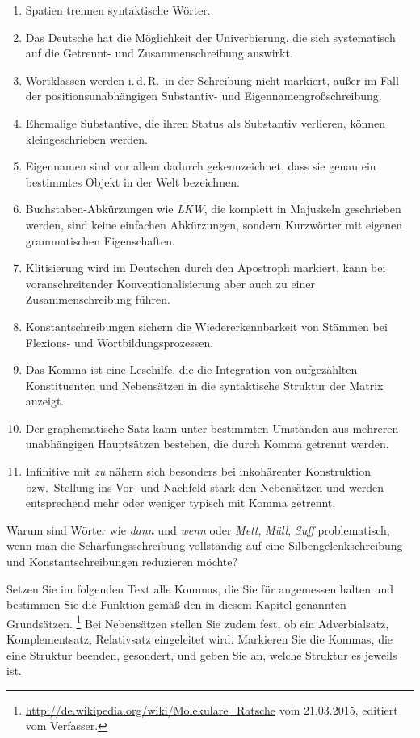 \begin{enumerate}\Lf
  \item Spatien trennen syntaktische Wörter.
  \item Das Deutsche hat die Möglichkeit der Univerbierung, die sich systematisch auf die Getrennt- und Zusammenschreibung auswirkt.
  \item Wortklassen werden i.\,d.\,R.\ in der Schreibung nicht markiert, außer im Fall der positionsunabhängigen Substantiv- und Eigennamengroßschreibung.
  \item Ehemalige Substantive, die ihren Status als Substantiv verlieren, können kleingeschrieben werden.
  \item Eigennamen sind vor allem dadurch gekennzeichnet, dass sie genau ein bestimmtes Objekt in der Welt bezeichnen.
  \item Buchstaben-Abkürzungen wie \textit{LKW}, die komplett in Majuskeln geschrieben werden, sind keine einfachen Abkürzungen, sondern Kurzwörter mit eigenen grammatischen Eigenschaften. 
  \item Klitisierung wird im Deutschen durch den Apostroph markiert, kann bei voranschreitender Konventionalisierung aber auch zu einer Zusammenschreibung führen.
  \item Konstantschreibungen sichern die Wiedererkennbarkeit von Stämmen bei Flexions- und Wortbildungsprozessen.
  \item Das Komma ist eine Lesehilfe, die die Integration von aufgezählten Konstituenten und Nebensätzen in die syntaktische Struktur der Matrix anzeigt.
  \item Der graphematische Satz kann unter bestimmten Umständen aus mehreren unabhängigen Hauptsätzen bestehen, die durch Komma getrennt werden.
  \item Infinitive mit \textit{zu} nähern sich besonders bei inkohärenter Konstruktion bzw.\ Stellung ins Vor- und Nachfeld stark den Nebensätzen und werden entsprechend mehr oder weniger typisch mit Komma getrennt.
\end{enumerate}

\Uebungen

\Uebung[\tristar] \label{u151} Warum sind Wörter wie \textit{dann} und \textit{wenn} oder \textit{Mett}, \textit{Müll}, \textit{Suff} problematisch, wenn man die Schärfungsschreibung vollständig auf eine Silbengelenkschreibung und Konstantschreibungen reduzieren möchte?

\Uebung \label{u153} Setzen Sie im folgenden Text alle Kommas, die Sie für angemessen halten und bestimmen Sie die Funktion gemäß den in diesem Kapitel genannten Grundsätzen.%
\footnote{\url{http://de.wikipedia.org/wiki/Molekulare_Ratsche} vom 21.03.2015, editiert vom Verfasser.}
Bei Nebensätzen stellen Sie zudem fest, ob ein Adverbialsatz, Komplementsatz, Relativsatz eingeleitet wird.
Markieren Sie die Kommas, die eine Struktur beenden, gesondert, und geben Sie an, welche Struktur es jeweils ist.

